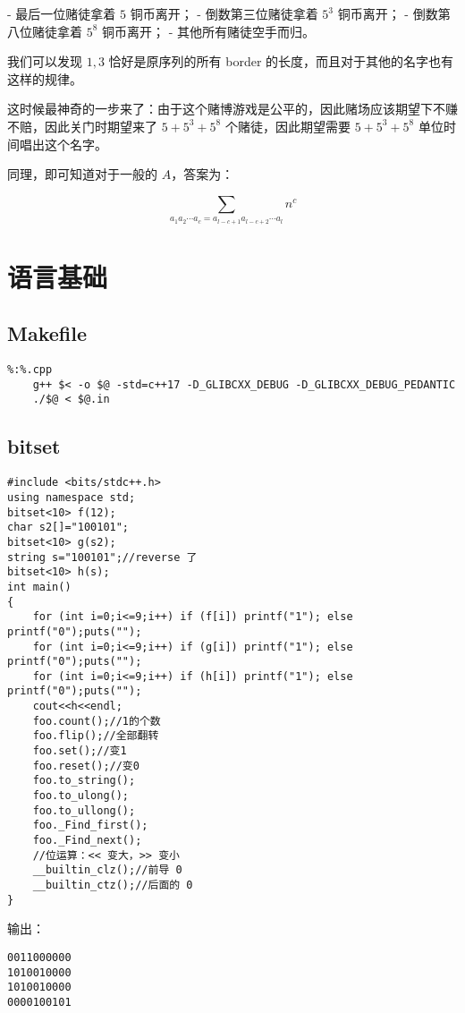\documentclass[12pt]{ctexart}
\begin{document}
- 最后一位赌徒拿着 $5$ 铜币离开；
- 倒数第三位赌徒拿着 $5^3$ 铜币离开；
- 倒数第八位赌徒拿着 $5^8$ 铜币离开；
- 其他所有赌徒空手而归。

我们可以发现 $1,3$ 恰好是原序列的所有 border 的长度，而且对于其他的名字也有这样的规律。

这时候最神奇的一步来了：由于这个赌博游戏是公平的，因此赌场应该期望下不赚不赔，因此关门时期望来了 $5+5^3+5^8$ 个赌徒，因此期望需要 $5+5^3+5^8$ 单位时间唱出这个名字。

同理，即可知道对于一般的 $A$，答案为：

$$\sum\limits_{a_1a_2\cdots a_c=a_{l-c+1}a_{l-c+2}\cdots a_l} n^c$$


 \newpage

\section{语言基础}

\subsection{Makefile}

\begin{lstlisting}
%:%.cpp
	g++ $< -o $@ -std=c++17 -D_GLIBCXX_DEBUG -D_GLIBCXX_DEBUG_PEDANTIC
	./$@ < $@.in
\end{lstlisting}


\subsection{bitset}

\begin{lstlisting}
#include <bits/stdc++.h>
using namespace std;
bitset<10> f(12);
char s2[]="100101";
bitset<10> g(s2);
string s="100101";//reverse 了
bitset<10> h(s);
int main()
{
	for (int i=0;i<=9;i++) if (f[i]) printf("1"); else printf("0");puts("");
	for (int i=0;i<=9;i++) if (g[i]) printf("1"); else printf("0");puts("");
	for (int i=0;i<=9;i++) if (h[i]) printf("1"); else printf("0");puts("");
	cout<<h<<endl;
    foo.count();//1的个数
	foo.flip();//全部翻转
	foo.set();//变1
	foo.reset();//变0
	foo.to_string();
	foo.to_ulong();
	foo.to_ullong();
	foo._Find_first();
	foo._Find_next();
    //位运算：<< 变大，>> 变小
    __builtin_clz();//前导 0
    __builtin_ctz();//后面的 0
}
\end{lstlisting}

输出：

\begin{verbatim}
0011000000
1010010000
1010010000
0000100101
\end{verbatim}
\end{document}
